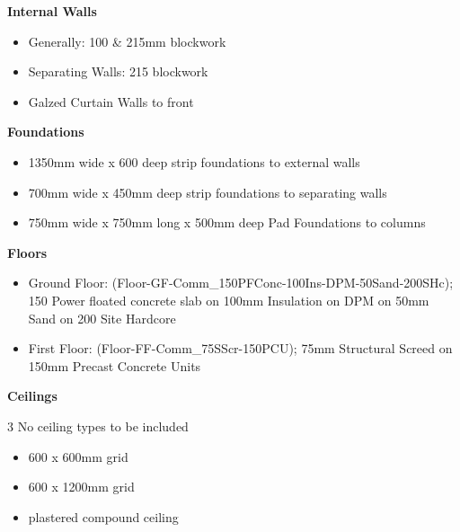 \begin{flushleft}
	\large\textbf{Internal Walls}\\
\end{flushleft}

\begin{itemize}
	\item Generally: 100 \& 215mm blockwork
	\item Separating Walls: 215 blockwork
	\item Galzed Curtain Walls to front
\end{itemize}


\begin{flushleft}
	\large\textbf{Foundations}\\
\end{flushleft}

\begin{itemize}
	\item 1350mm wide x 600  deep strip foundations to external walls
	\item 700mm wide x 450mm deep strip foundations to separating walls
	\item 750mm wide x 750mm long x 500mm deep Pad Foundations to columns
\end{itemize}




\begin{flushleft}
	\large\textbf{Floors}\\
\end{flushleft}

\begin{itemize}
	\item Ground Floor: (Floor-GF-Comm\_150PFConc-100Ins-DPM-50Sand-200SHc); 150 Power floated concrete slab on 100mm Insulation on DPM on 50mm Sand on 200 Site Hardcore
	\item First Floor: (Floor-FF-Comm\_75SScr-150PCU); 75mm Structural Screed on 150mm Precast Concrete Units
\end{itemize}


\begin{flushleft}
	\large\textbf{Ceilings}\\
\end{flushleft}
3 No ceiling types to be included
\begin{itemize}
	\item 600 x 600mm grid
	\item 600 x 1200mm grid
	\item plastered compound ceiling
\end{itemize}



